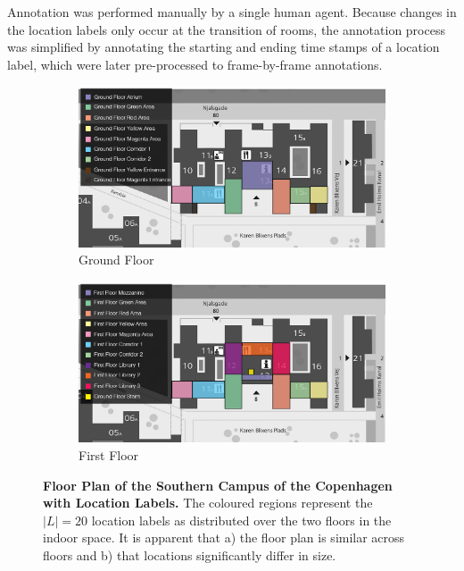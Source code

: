 \documentclass[a4paper]{article}
\begin{document}
Annotation was performed manually by a single human agent. Because changes in
the location labels only occur at the transition of rooms, the annotation
process was simplified by annotating the starting and ending time stamps of a
location label, which were later pre-processed to frame-by-frame annotations.

\begin{figure}[ht]
\centering

\begin{subfigure}[b]{.7\linewidth}
  \centering
  \includegraphics[width=\linewidth]{figures/map-ground-floor.jpg}
  \caption{Ground Floor}
  \label{fig:map-ground-floor}
\end{subfigure}

\hfill

\begin{subfigure}[b]{0.7\linewidth}
  \centering
  \includegraphics[width=\linewidth]{figures/map-first-floor.jpg}
  \caption{First Floor}
  \label{fig:map-first-floor}
\end{subfigure}

\caption{
  \textbf{Floor Plan of the Southern Campus of the Copenhagen with Location
  Labels.} The coloured regions represent the $|L|=20$ location labels as
  distributed over the two floors in the indoor space. It is apparent that
  a) the floor plan is similar across floors and b) that locations
  significantly differ in size.
}
\label{fig:map}
\end{figure}
\end{document}
